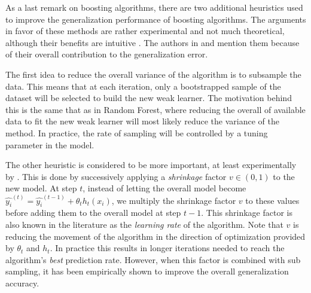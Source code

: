 



As a last remark on boosting algorithms, there are two additional heuristics used to improve the generalization performance of boosting algorithms. The arguments in favor of these methods are rather experimental and not much theoretical, although their benefits are intuitive . The authors in \textcite{hastie-elemstatslearn} and \textcite{bishop-patternRecognition} mention them because of their overall contribution to the generalization error.

The first idea to reduce the overall variance of the algorithm is to subsample the data. This means that at each iteration, only a bootstrapped sample of the dataset will be selected to build the new weak learner. The motivation behind this is the same that as in Random Forest, where reducing the overall of available data to fit the new weak learner will most likely reduce the variance of the method. In practice, the rate of sampling will be controlled by a tuning parameter in the model.

The other heuristic is considered to be more important, at least experimentally by \textcite{hastie-elemstatslearn}. This is done by successively applying a \textit{shrinkage} factor $v \in  (0,1)$ to the new model.  At step $t$, instead of letting the overall model become $ \hat{y_i}^{(t)} = \hat{y_i}^{(t-1)} +  \theta_t h_t(x_i) $, we multiply the shrinkage factor $v$ to these values before adding them to the overall model at step $t-1$. This shrinkage factor is also known in the literature as the \textit{learning rate} of the algorithm.  Note that $v$  is reducing the movement of the algorithm in the direction of optimization provided by $\theta_t$ and $h_t$. In practice this results in longer iterations needed to reach the algorithm's \textit{best} prediction rate. However, when this factor is combined with sub sampling, it has been empirically shown to improve the overall generalization accuracy.



